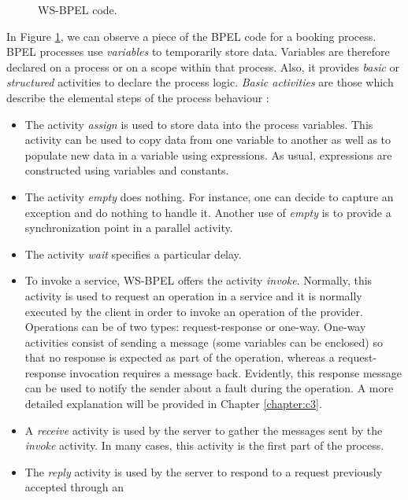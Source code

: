 \begin{figure}[h]
\begin{center}
\end{center}
\caption{WS-BPEL code.}
\label{bpelcode}
\end{figure}

In Figure \ref{bpelcode}, we can observe a piece of the BPEL code for a booking process. 
BPEL processes use {\em variables} to temporarily store 
data. Variables are therefore declared on a process or on a scope 
within that process. Also, 
it provides \emph{basic} or \emph{structured} activities to declare the process logic. 
\emph{Basic activities} are those which describe the elemental 
steps of the process behaviour \cite{wsbpelstandard}: 
\begin{itemize}
\item The activity \emph{assign} is used to store data into the process variables. 
This activity can be used to copy data from one variable to another as well as to
populate new data in a variable using expressions. As usual, expressions are constructed using 
variables and constants. 
\item The activity \emph{empty} does nothing. For instance, one can
decide to capture an exception and do nothing to handle it. Another use of \emph{empty} is
to provide a synchronization point in a parallel activity.
\item The activity \emph{wait} specifies a particular delay. 
\item To invoke a service, WS-BPEL offers the activity {\em invoke}. 
Normally, this activity is used to request an operation in a service and it is normally executed by the client in order to invoke an operation
of the provider. Operations can be of two types: request-response or one-way.
One-way activities consist of sending a message (some variables can be enclosed) so that no response is expected
as part of the operation, whereas a request-response invocation requires a message back. Evidently, this
response message can be used to notify the sender about a fault during the operation. A more detailed
explanation will be provided in Chapter \ref{chapter:c3}. 
\item A \emph{receive} activity is used by the server to gather the messages sent by the \emph{invoke} activity.
In many cases, this activity is the first part of the process.
\item The \emph{reply} activity is used by the server to respond to a request previously accepted through an

\end{itemize}
